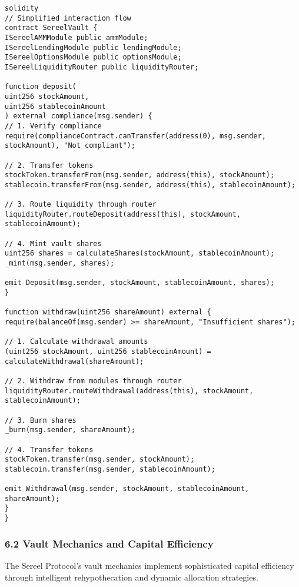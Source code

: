 \documentclass[12pt]{article}
\begin{document}
{{{\begin{itemize}
\end{itemize}


\begin{lstlisting}
solidity
// Simplified interaction flow
contract SereelVault {
ISereelAMMModule public ammModule;
ISereelLendingModule public lendingModule;
ISereelOptionsModule public optionsModule;
ISereelLiquidityRouter public liquidityRouter;

function deposit(
uint256 stockAmount,
uint256 stablecoinAmount
) external compliance(msg.sender) {
// 1. Verify compliance
require(complianceContract.canTransfer(address(0), msg.sender, stockAmount), "Not compliant");

// 2. Transfer tokens
stockToken.transferFrom(msg.sender, address(this), stockAmount);
stablecoin.transferFrom(msg.sender, address(this), stablecoinAmount);

// 3. Route liquidity through router
liquidityRouter.routeDeposit(address(this), stockAmount, stablecoinAmount);

// 4. Mint vault shares
uint256 shares = calculateShares(stockAmount, stablecoinAmount);
_mint(msg.sender, shares);

emit Deposit(msg.sender, stockAmount, stablecoinAmount, shares);
}

function withdraw(uint256 shareAmount) external {
require(balanceOf(msg.sender) >= shareAmount, "Insufficient shares");

// 1. Calculate withdrawal amounts
(uint256 stockAmount, uint256 stablecoinAmount) = calculateWithdrawal(shareAmount);

// 2. Withdraw from modules through router
liquidityRouter.routeWithdrawal(address(this), stockAmount, stablecoinAmount);

// 3. Burn shares
_burn(msg.sender, shareAmount);

// 4. Transfer tokens
stockToken.transfer(msg.sender, stockAmount);
stablecoin.transfer(msg.sender, stablecoinAmount);

emit Withdrawal(msg.sender, stockAmount, stablecoinAmount, shareAmount);
}
}
\end{lstlisting}

\subsubsection{6.2 Vault Mechanics and Capital Efficiency} %

The Sereel Protocol's vault mechanics implement sophisticated capital efficiency through intelligent rehypothecation and dynamic allocation strategies.

}}}
\end{document}
